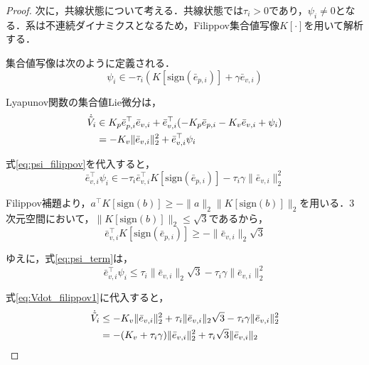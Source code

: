 \documentclass[a4paper]{jarticle}
\theoremstyle{definition}
\theoremstyle{remark}
\numberwithin{equation}{section}
\begin{document}
\begin{proof}
		次に，共線状態について考える．共線状態では$\tau_i > 0$であり，$\psi_i \neq 0$となる．系は不連続ダイナミクスとなるため，Filippov集合値写像$K[\cdot]$を用いて解析する\cite{yoshi}．
		
		集合値写像は次のように定義される．
		\begin{equation}
			\psi_i \in -\tau_i(K[\mathrm{sign}(\bar{e}_{p,i})] + \gamma \bar{e}_{v,i})
			\label{eq:psi_filippov}
		\end{equation}
		
		Lyapunov関数の集合値Lie微分は，
		\begin{align}
			\dot{\tilde{V}}_i &\in K_p \bar{e}_{p,i}^\top \bar{e}_{v,i} + \bar{e}_{v,i}^\top (-K_p \bar{e}_{p,i} - K_v \bar{e}_{v,i} + \psi_i) \notag\\
			&= -K_v \|\bar{e}_{v,i}\|_2^2 + \bar{e}_{v,i}^\top \psi_i
			\label{eq:Vdot_filippov1}
		\end{align}
		
		式\eqref{eq:psi_filippov}を代入すると，
		\begin{equation}
			\bar{e}_{v,i}^\top \psi_i \in -\tau_i \bar{e}_{v,i}^\top K[\mathrm{sign}(\bar{e}_{p,i})] - \tau_i \gamma \|\bar{e}_{v,i}\|_2^2
			\label{eq:psi_term}
		\end{equation}
		
		Filippov補題\cite{yoshi}より，$a^\top K[\mathrm{sign}(b)] \ge -\|a\|_2 \|K[\mathrm{sign}(b)]\|_2$を用いる．3次元空間において，$\|K[\mathrm{sign}(b)]\|_2 \le \sqrt{3}$であるから，
		\begin{equation}
			\bar{e}_{v,i}^\top K[\mathrm{sign}(\bar{e}_{p,i})] \ge -\|\bar{e}_{v,i}\|_2 \sqrt{3}
			\label{eq:filippov_lemma}
		\end{equation}
		
		ゆえに，式\eqref{eq:psi_term}は，
		\begin{equation}
			\bar{e}_{v,i}^\top \psi_i \le \tau_i \|\bar{e}_{v,i}\|_2 \sqrt{3} - \tau_i \gamma \|\bar{e}_{v,i}\|_2^2
			\label{eq:psi_upper}
		\end{equation}
		
		式\eqref{eq:Vdot_filippov1}に代入すると，
		\begin{align}
			\dot{\tilde{V}}_i &\le -K_v \|\bar{e}_{v,i}\|_2^2 + \tau_i \|\bar{e}_{v,i}\|_2 \sqrt{3} - \tau_i \gamma \|\bar{e}_{v,i}\|_2^2 \notag\\
			&= -(K_v + \tau_i \gamma) \|\bar{e}_{v,i}\|_2^2 + \tau_i \sqrt{3} \|\bar{e}_{v,i}\|_2
			\label{eq:Vdot_filippov2}
		\end{align}
		

\end{proof}
\end{document}
